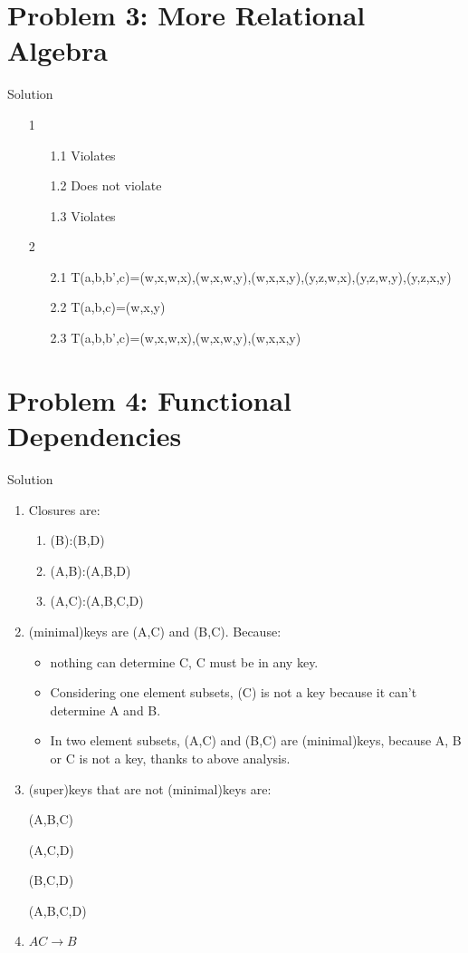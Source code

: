 \documentclass[letter,11pt]{article}
\begin{document}
\section*{Problem 3: More Relational Algebra}Solution

\begin{enumerate}
\item[1]
  \begin{enumerate}
  \item[1.1] Violates
  \item[1.2] Does not violate
  \item[1.3] Violates
  \end{enumerate}
\item[2]
  \begin{enumerate}
  \item[2.1] T(a,b,b',c)={(w,x,w,x),(w,x,w,y),(w,x,x,y),(y,z,w,x),(y,z,w,y),(y,z,x,y)}
  \item[2.2] T(a,b,c)={(w,x,y)}
  \item[2.3] T(a,b,b',c)={(w,x,w,x),(w,x,w,y),(w,x,x,y)}
  \end{enumerate}
\end{enumerate}

\section*{Problem 4: Functional Dependencies}Solution
\begin{enumerate}
\item Closures are:
  \begin{enumerate}
  \item (B):(B,D)
  \item(A,B):(A,B,D)
  \item (A,C):(A,B,C,D)
  \end{enumerate}
\item (minimal)keys are (A,C) and (B,C). Because:
  \begin{itemize}
  \item nothing can determine C, C must be in any key. 
  \item Considering one element subsets, (C) is not a key because it can't determine A and B.
  \item In two element subsets, (A,C) and (B,C) are (minimal)keys, because A, B or C is not a key, thanks to above analysis.
  \end{itemize}
\item (super)keys that are not (minimal)keys are:

  (A,B,C)

  (A,C,D)

  (B,C,D)

  (A,B,C,D)

\item

  $AC\to B$

\end{enumerate}
\end{document}
